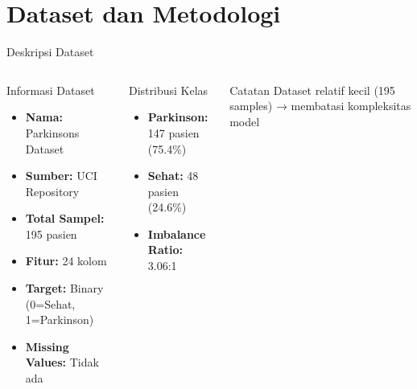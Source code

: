 \documentclass[aspectratio=169]{beamer}
\begin{document}
\section{Dataset dan Metodologi}

\begin{frame}{Deskripsi Dataset}
\begin{columns}
\begin{block}{Informasi Dataset}
\begin{itemize}
    \item \textbf{Nama:} Parkinsons Dataset
    \item \textbf{Sumber:} UCI Repository
    \item \textbf{Total Sampel:} 195 pasien
    \item \textbf{Fitur:} 24 kolom
    \item \textbf{Target:} Binary (0=Sehat, 1=Parkinson)
    \item \textbf{Missing Values:} Tidak ada
\end{itemize}
\end{block}

\begin{block}{Distribusi Kelas}
\begin{itemize}
    \item \textbf{Parkinson:} 147 pasien (75.4\%)
    \item \textbf{Sehat:} 48 pasien (24.6\%)
    \item \textbf{Imbalance Ratio:} 3.06:1
\end{itemize}
\end{block}

\begin{alertblock}{Catatan}
Dataset relatif kecil (195 samples) → membatasi kompleksitas model
\end{alertblock}
\end{columns}
\end{frame}
\end{document}
